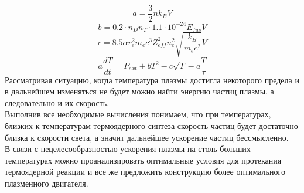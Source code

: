 \documentclass[a4paper,11pt]{article}
\begin{document}

\begin{equation}
	a = \frac{3}{2}nk_BV
\end{equation}
\begin{equation}
	b = 0.2 \cdot n_Dn_T \cdot 1.1 \cdot 10^{-24} E_{fus}V 
\end{equation}
\begin{equation}
	c = 8.5\alpha r_e^2 m_ec^3Z_{eff}^2n_e^2\sqrt{\frac{k_B}{m_ec^2}}V 
\end{equation}
\begin{equation}
	a\frac{dT}{dt} = P_{ext} + bT^2 - c\sqrt{T} - a\frac{T}{\tau}
\end{equation}
Рассматривая ситуацию, когда температура плазмы достигла некоторого предела и в дальнейшем изменяться не будет можно найти энергию частиц плазмы, а следовательно и их скорость. \\
\indent Выполнив все необходимые вычисления понимаем, что при температурах, близких к температурам термоядерного синтеза скорость частиц будет достаточно близка к скорости света, а значит дальнейшее ускорение частиц бессмысленно. \\
\indent В связи с нецелесообразностью ускорения плазмы на столь больших температурах можно проанализировать оптимальные условия для протекания термоядерной реакции и все же предложить конструкцию более оптимального плазменного двигателя. 
\end{document}
